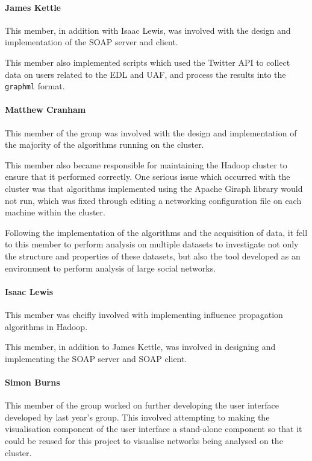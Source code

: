 \paragraph{James Kettle}
This member, in addition with Isaac Lewis, was involved with the design and implementation of the SOAP server and client.

This member also implemented scripts which used the Twitter API to collect data on users related to the EDL and UAF, and process the results into the \verb/graphml/ format.

\paragraph{Matthew Cranham}
This member of the group was involved with the design and implementation of the majority of the algorithms running on the cluster. 

This member also became responsible for maintaining the Hadoop cluster to ensure that it performed correctly. One serious issue which occurred with the cluster was that algorithms implemented using the Apache Giraph library would not run, which was fixed through editing a networking configuration file on each machine within the cluster.

Following the implementation of the algorithms and the acquisition of data, it fell to this member to perform analysis on multiple datasets to investigate not only the structure and properties of these datasets, but also the tool developed as an environment to perform analysis of large social networks.

\paragraph{Isaac Lewis}
This member was cheifly involved with implementing influence propagation algorithms in Hadoop. 

This member, in addition to James Kettle, was involved in designing and implementing the SOAP server and SOAP client. 

\paragraph{Simon Burns}
This member of the group worked on further developing the user interface developed by last year's group. This involved attempting to making the visualisation component of the user interface a stand-alone component so that it could be reused for this project to visualise networks being analysed on the cluster.
